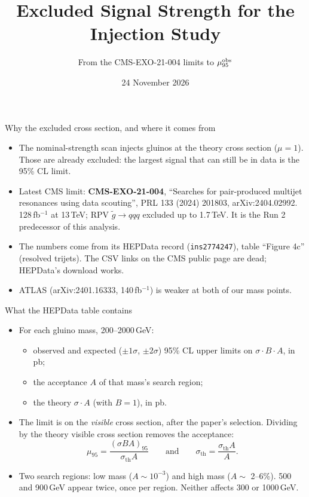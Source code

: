 \documentclass[aspectratio=169,11pt]{beamer}
\title{\textbf{Excluded Signal Strength for the Injection Study}}
\subtitle{From the CMS-EXO-21-004 limits to $\mu_{95}^{\text{obs}}$}
\date{24 November 2026}
\begin{document}
\begin{frame}[plain]
  \titlepage
\end{frame}

\begin{frame}{Why the excluded cross section, and where it comes from}
  \begin{itemize}
    \item The nominal-strength scan injects gluinos at the theory cross section
          ($\mu = 1$). Those are already excluded: the largest signal that can
          still be in data is the 95\% CL limit.
    \item Latest CMS limit: \textbf{CMS-EXO-21-004}, ``Searches for pair-produced
          multijet resonances using data scouting'', PRL 133 (2024) 201803,
          arXiv:2404.02992. 128\,fb$^{-1}$ at 13\,TeV; RPV $\tilde g \to qqq$
          excluded up to 1.7\,TeV. It is the Run 2 predecessor of this analysis.
    \item The numbers come from its HEPData record (\texttt{ins2774247}), table
          ``Figure 4c'' (resolved trijets). The CSV links on the CMS public page
          are dead; HEPData's download works.
    \item ATLAS (arXiv:2401.16333, 140\,fb$^{-1}$) is weaker at both of our mass
          points.
  \end{itemize}
\end{frame}

\begin{frame}{What the HEPData table contains}
  \begin{itemize}
    \item For each gluino mass, 200--2000\,GeV:
      \begin{itemize}
        \item observed and expected ($\pm1\sigma$, $\pm2\sigma$) 95\% CL upper
              limits on $\sigma \cdot B \cdot A$, in pb;
        \item the acceptance $A$ of that mass's search region;
        \item the theory $\sigma \cdot A$ (with $B = 1$), in pb.
      \end{itemize}
    \item The limit is on the \emph{visible} cross section, after the paper's
          selection. Dividing by the theory visible cross section removes the
          acceptance:
          \[ \mu_{95} = \frac{(\sigma B A)_{95}}{\sigma_{\text{th}} A}
             \qquad\text{and}\qquad \sigma_{\text{th}} = \frac{\sigma_{\text{th}} A}{A}. \]
    \item Two search regions: low mass ($A \sim 10^{-3}$) and high mass
          ($A \sim$ 2--6\%). 500 and 900\,GeV appear twice, once per region.
          Neither affects 300 or 1000\,GeV.
  \end{itemize}
\end{frame}
\end{document}
